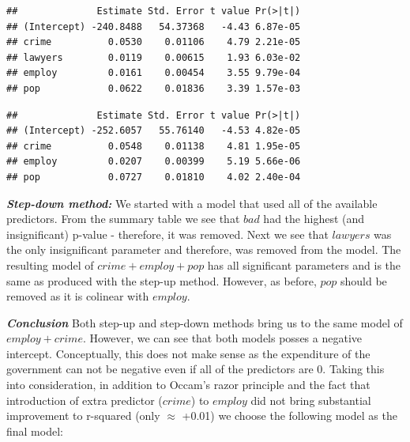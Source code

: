 \documentclass[
  10pt,
]{article}
\newenvironment{Shaded}{\begin{snugshade}}{\end{snugshade}}
\newcommand{\AttributeTok}[1]{\textcolor[rgb]{0.77,0.63,0.00}{#1}}
\newcommand{\CommentTok}[1]{\textcolor[rgb]{0.56,0.35,0.01}{\textit{#1}}}
\newcommand{\FunctionTok}[1]{\textcolor[rgb]{0.00,0.00,0.00}{#1}}
\newcommand{\NormalTok}[1]{#1}
\newcommand{\SpecialCharTok}[1]{\textcolor[rgb]{0.00,0.00,0.00}{#1}}
\begin{document}
\begin{verbatim}
##              Estimate Std. Error t value Pr(>|t|)
## (Intercept) -240.8488   54.37368   -4.43 6.87e-05
## crime          0.0530    0.01106    4.79 2.21e-05
## lawyers        0.0119    0.00615    1.93 6.03e-02
## employ         0.0161    0.00454    3.55 9.79e-04
## pop            0.0622    0.01836    3.39 1.57e-03
\end{verbatim}

\begin{Shaded}
\end{Shaded}

\begin{verbatim}
##              Estimate Std. Error t value Pr(>|t|)
## (Intercept) -252.6057   55.76140   -4.53 4.82e-05
## crime          0.0548    0.01138    4.81 1.95e-05
## employ         0.0207    0.00399    5.19 5.66e-06
## pop            0.0727    0.01810    4.02 2.40e-04
\end{verbatim}

\textbf{\emph{Step-down method:}} We started with a model that used all
of the available predictors. From the summary table we see that \(bad\)
had the highest (and insignificant) p-value - therefore, it was removed.
Next we see that \(lawyers\) was the only insignificant parameter and
therefore, was removed from the model. The resulting model of
\(crime + employ + pop\) has all significant parameters and is the same
as produced with the step-up method. However, as before, \(pop\) should
be removed as it is colinear with \(employ\).

\textbf{\emph{Conclusion}} Both step-up and step-down methods bring us
to the same model of \(employ + crime\). However, we can see that both
models posses a negative intercept. Conceptually, this does not make
sense as the expenditure of the government can not be negative even if
all of the predictors are 0. Taking this into consideration, in addition
to Occam's razor principle and the fact that introduction of extra
predictor (\(crime\)) to \(employ\) did not bring substantial
improvement to r-squared (only \(\approx\) +0.01) we choose the
following model as the final model:
\end{document}
